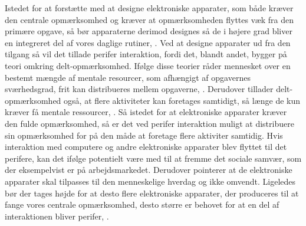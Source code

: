 Istedet for at forstætte med at designe elektroniske apparater, som både kræver den centrale opmærksomhed og kræver at opmærksomheden flyttes væk fra den primære opgave, så bør apparaterne derimod designes så de i højere grad bliver en integreret del af vores daglige rutiner, \parencite[s. 239]{PDF:PICharacteristicsAndConsiderations}. Ved at designe apparater ud fra den tilgang så vil det tillade perifer interaktion, fordi det, blandt andet, bygger på teori omkring delt-opmærksomhed. Ifølge disse teorier råder mennesket over en bestemt mængde af mentale resourcer, som afhængigt af opgavernes sværhedsgrad, frit kan distribueres mellem opgaverne, \parencite[s. 240]{PDF:PICharacteristicsAndConsiderations}. Derudover tillader delt-opmærksomhed også, at flere aktiviteter kan foretages samtidigt, så længe de kun kræver få mentale ressourcer, \parencite[s. 2]{PDF:FacilitatingPIDesignAndEvaluation}. Så istedet for at elektroniske apparater kræver den fulde opmærksomhed, så er det ved perifer interaktion muligt at distribuere sin opmærksomhed for på den måde at foretage flere aktiviter samtidig. Hvis interaktion med computere og andre elektroniske apparater blev flyttet til det perifere, kan det ifølge \textcite[s. 11]{PDF:TheComputerWeiser} potentielt være med til at fremme det sociale samvær, som der eksempelvist er på arbejdsmarkedet. Derudover pointerer \textcite[s. 11]{PDF:TheComputerWeiser} at de elektroniske apparater skal tilpasses til den menneskelige hverdag og ikke omvendt. Ligeledes bør der tages højde for at desto flere elektroniske apparater, der produceres til at fange vores centrale opmærksomhed, desto større er behovet for at en del af interaktionen bliver perifer, \parencite[s. 240]{PDF:PICharacteristicsAndConsiderations}.
%
